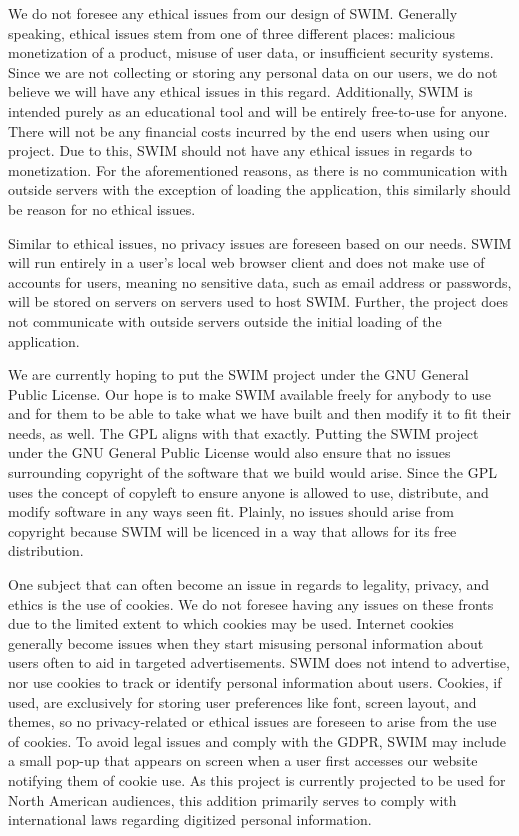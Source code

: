 \documentclass[parskip=half, fontsize=12pt]{scrartcl}
\begin{document}
We do not foresee any ethical issues from our design of SWIM. Generally speaking, ethical issues stem from one of three different places: malicious monetization of a product, misuse of user data, or insufficient security systems. Since we are not collecting or storing any personal data on our users, we do not believe we will have any ethical issues in this regard. Additionally, SWIM is intended purely as an educational tool and will be entirely free-to-use for anyone. There will not be any financial costs incurred by the end users when using our project. Due to this, SWIM should not have any ethical issues in regards to monetization. For the aforementioned reasons, as there is no communication with outside servers with the exception of loading the application, this similarly should be reason for no ethical issues.

Similar to ethical issues, no privacy issues are foreseen based on our needs. SWIM will run entirely in a user's local web browser client and does not make use of accounts for users, meaning no sensitive data, such as email address or passwords, will be stored on servers on servers used to host SWIM. Further, the project does not communicate with outside servers outside the initial loading of the application.

We are currently hoping to put the SWIM project under the GNU General Public License. Our hope is to make SWIM available freely for anybody to use and for them to be able to take what we have built and then modify it to fit their needs, as well. The GPL aligns with that exactly.  Putting the SWIM project under the GNU General Public License would also ensure that no issues surrounding copyright of the software that we build would arise. Since the GPL uses the concept of copyleft to ensure anyone is allowed to use, distribute, and modify software in any ways seen fit. Plainly, no issues should arise from copyright because SWIM will be licenced in a way that allows for its free distribution.

One subject that can often become an issue in regards to legality, privacy, and ethics is the use of cookies. We do not foresee having any issues on these fronts due to the limited extent to which cookies may be used. Internet cookies generally become issues when they start misusing personal information about users often to aid in targeted advertisements. SWIM does not intend to advertise, nor use cookies to track or identify personal information about users. Cookies, if used, are exclusively for storing user preferences like font, screen layout, and themes, so no privacy-related or ethical issues are foreseen to arise from the use of cookies. To avoid legal issues and comply with the GDPR, SWIM may include a small pop-up that appears on screen when a user first accesses our website notifying them of cookie use. As this project is currently projected to be used for North American audiences, this addition primarily serves to comply with international laws regarding digitized personal information.
\end{document}
